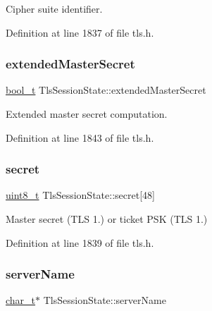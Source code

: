 Cipher suite identifier. 



Definition at line 1837 of file tls.\+h.

\mbox{\label{structTlsSessionState_a1345e3eac1e2a0fb86af8e0f0c7b123a}} 
\subsubsection{\texorpdfstring{extended\+Master\+Secret}{extendedMasterSecret}}
{\footnotesize\ttfamily \hyperlink{compiler__port_8h_a812d16e5494522586b3784e55d479912}{bool\+\_\+t} Tls\+Session\+State\+::extended\+Master\+Secret}



Extended master secret computation. 



Definition at line 1843 of file tls.\+h.

\mbox{\label{structTlsSessionState_af48b2d61b9483b6f1bb698c719c5bd3f}} 
\subsubsection{\texorpdfstring{secret}{secret}}
{\footnotesize\ttfamily \hyperlink{stdint_8h_aba7bc1797add20fe3efdf37ced1182c5}{uint8\+\_\+t} Tls\+Session\+State\+::secret\mbox{[}48\mbox{]}}



Master secret (T\+LS 1.) or ticket P\+SK (T\+LS 1.) 



Definition at line 1839 of file tls.\+h.

\mbox{\label{structTlsSessionState_a9e4b28fa363d10a42e24879e0ba57813}} 
\subsubsection{\texorpdfstring{server\+Name}{serverName}}
{\footnotesize\ttfamily \hyperlink{compiler__port_8h_a40bb5262bf908c328fbcfbe5d29d0201}{char\+\_\+t}$\ast$ Tls\+Session\+State\+::server\+Name}



